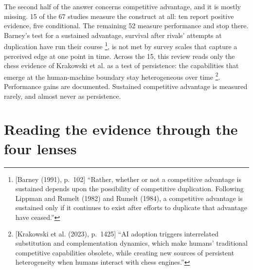 The second half of the answer concerns competitive advantage, and it is mostly missing.
15 of the 67 studies measure the construct at all: ten report positive evidence, five
conditional. The remaining 52 measure performance and stop there. Barney's test for a
sustained advantage, survival after rivals' attempts at duplication have run their
course \parencite[p.~102]{barney1991firm}\footnote{[Barney (1991), p.~102] ``Rather,
whether or not a competitive advantage is sustained depends upon the possibility of
competitive duplication. Following Lippman and Rumelt (1982) and Rumelt (1984), a
competitive advantage is sustained only if it continues to exist after efforts to
duplicate that advantage have ceased.''}, is not met by survey scales that capture a
perceived edge at one point in time. Across the 15, this review reads only the chess
evidence of Krakowski et al. as a test of persistence: the capabilities that emerge at
the human-machine boundary stay heterogeneous over
time \parencite[p.~1425]{krakowski2023artificial}\footnote{[Krakowski et al. (2023),
p.~1425] ``AI adoption triggers interrelated substitution and complementation dynamics,
which make humans' traditional competitive capabilities obsolete, while creating new
sources of persistent heterogeneity when humans interact with chess engines.''}.
Performance gains are documented. Sustained competitive advantage is measured rarely,
and almost never as persistence.

\section{Reading the evidence through the four lenses}
\label{sec:disc-theory}

